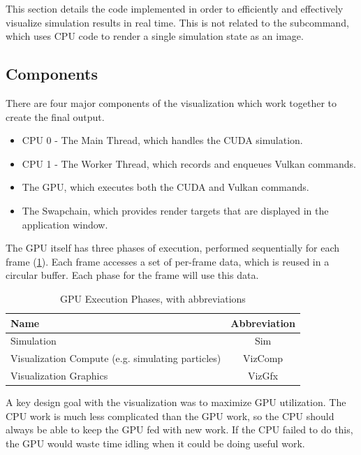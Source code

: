 This section details the code implemented in order to efficiently and effectively visualize simulation results in real time.
This is not related to the  subcommand, which uses CPU code to render a single simulation state as an image.

\subsection{Components}
There are four major components of the visualization which work together to create the final output.
\begin{itemize}
    \item CPU 0 - The Main Thread, which handles the CUDA simulation.
    \item CPU 1 - The Worker Thread, which records and enqueues Vulkan commands.
    \item The GPU, which executes both the CUDA and Vulkan commands.
    \item The Swapchain, which provides render targets that are displayed in the application window.
\end{itemize}
The GPU itself has three phases of execution, performed sequentially for each frame (\cref{tab:gpuexecution}).
Each frame accesses a set of per-frame data, which is reused in a circular buffer.
Each phase for the frame will use this data.
\begin{table}[h]
    \centering
    \begin{tabular}{l|c}
    Name & Abbreviation \\
    \hline
    Simulation & Sim \\
    Visualization Compute (e.g. simulating particles) & VizComp \\
    Visualization Graphics & VizGfx \\
    \end{tabular}
    \caption{GPU Execution Phases, with abbreviations}
    \label{tab:gpuexecution}
\end{table}

A key design goal with the visualization was to maximize GPU utilization.
The CPU work is much less complicated than the GPU work, so the CPU should always be able to keep the GPU fed with new work.
If the CPU failed to do this, the GPU would waste time idling when it could be doing useful work.

